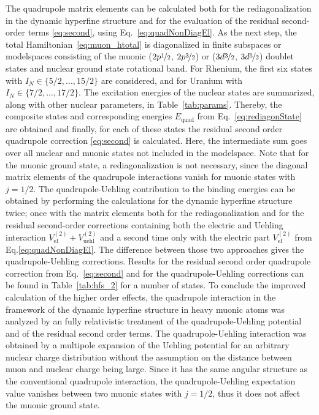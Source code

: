 The quadrupole matrix elements can be calculated both for the rediagonalization in the dynamic hyperfine structure and for the evaluation of the residual second-order terms \eqref{eq:second}, using Eq.~\eqref{eq:quadNonDiagEl}. As the next step, the total Hamiltonian~\eqref{eq:muon_htotal} is diagonalized in finite subspaces or modelspaces consisting of the muonic ($2p\nicefrac{1}{2}$, $2p\nicefrac{3}{2}$) or ($3d\nicefrac{3}{2}$, $3d\nicefrac{5}{2}$) doublet states and nuclear ground state rotational band. For Rhenium, the first six states with $I_N \in \{5/2,...,15/2\}$ are considered, and for Uranium with $I_N \in \{7/2,...,17/2\}$. The excitation energies of the nuclear states are summarized, along with other nuclear parameters, in Table~\ref{tab:params}. Thereby, the composite states and corresponding energies $E_{\text{quad}}$ from Eq.~\eqref{eq:rediagonState} are obtained and finally, for each of these states the residual second order quadrupole correction \eqref{eq:second} is calculated. Here, the intermediate sum goes over all nuclear and muonic states not included in the modelspace.
Note that for the muonic ground state, a rediagonalization is not necessary, since the diagonal matrix elements of the quadrupole interactions vanish for muonic states with $j=1/2$.
The quadrupole-Uehling contribution to the binding energies can be obtained by performing the calculations for the dynamic hyperfine structure twice; once with the matrix elements both for the rediagonalization and for the residual second-order corrections containing both the electric and Uehling interaction ${V_{\text{el}}^{(2)}}{+}{V_{\text{uehl}}^{(2)}}$ and a second time only with the electric part ${V_{\text{el}}^{(2)}}$ from Eq.\eqref{eq:quadNonDiagEl}. The difference between those two approaches gives the quadrupole-Uehling corrections. Results for the residual second order quadrupole correction from Eq.~\eqref{eq:second} and for the quadrupole-Uehling corrections can be found in Table~\ref{tab:hfs_2} for a number of states.
%
To conclude the improved calculation of the higher order effects, the quadrupole interaction in the framework of the dynamic hyperfine structure in heavy muonic atoms was analyzed by an fully relativistic treatment of the quadrupole-Uehling potential and of the residual second order terms.
The quadrupole-Uehling interaction was obtained by a multipole expansion of the Uehling potential for an arbitrary nuclear charge distribution without the assumption on the distance between muon and nuclear charge being large.
Since it has the same angular structure as the conventional quadrupole interaction, the quadrupole-Uehling expectation value vanishes between two muonic states with $j=1/2$, thus it does not affect the muonic ground state.
